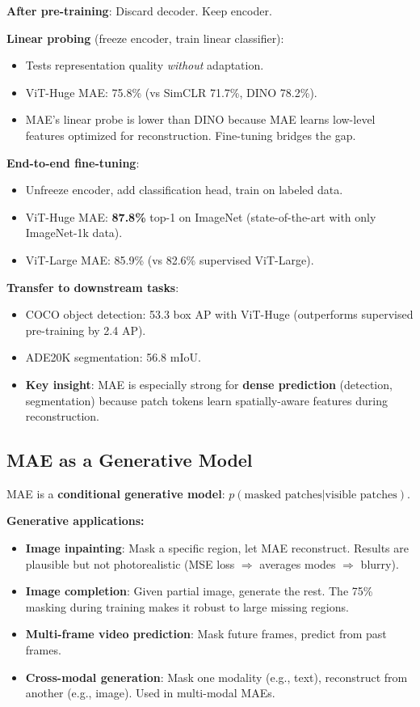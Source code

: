 \textbf{After pre-training}: Discard decoder. Keep encoder.

\textbf{Linear probing} (freeze encoder, train linear classifier):
\begin{itemize}
\item Tests representation quality \emph{without} adaptation.
\item ViT-Huge MAE: 75.8\% (vs SimCLR 71.7\%, DINO 78.2\%).
\item MAE's linear probe is lower than DINO because MAE learns low-level features optimized for reconstruction. Fine-tuning bridges the gap.
\end{itemize}

\textbf{End-to-end fine-tuning}:
\begin{itemize}
\item Unfreeze encoder, add classification head, train on labeled data.
\item ViT-Huge MAE: \textbf{87.8\%} top-1 on ImageNet (state-of-the-art with only ImageNet-1k data).
\item ViT-Large MAE: 85.9\% (vs 82.6\% supervised ViT-Large).
\end{itemize}

\textbf{Transfer to downstream tasks}:
\begin{itemize}
\item COCO object detection: 53.3 box AP with ViT-Huge (outperforms supervised pre-training by 2.4 AP).
\item ADE20K segmentation: 56.8 mIoU.
\item \textbf{Key insight}: MAE is especially strong for \textbf{dense prediction} (detection, segmentation) because patch tokens learn spatially-aware features during reconstruction.
\end{itemize}

\subsection{MAE as a Generative Model}
MAE is a \textbf{conditional generative model}: $p(\text{masked patches} | \text{visible patches})$.

\textbf{Generative applications:}
\begin{itemize}
\item \textbf{Image inpainting}: Mask a specific region, let MAE reconstruct. Results are plausible but not photorealistic (MSE loss $\Rightarrow$ averages modes $\Rightarrow$ blurry).
\item \textbf{Image completion}: Given partial image, generate the rest. The 75\% masking during training makes it robust to large missing regions.
\item \textbf{Multi-frame video prediction}: Mask future frames, predict from past frames.
\item \textbf{Cross-modal generation}: Mask one modality (e.g., text), reconstruct from another (e.g., image). Used in multi-modal MAEs.
\end{itemize}

